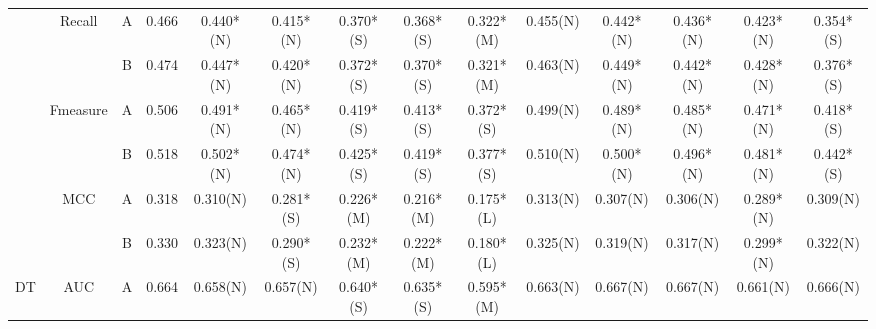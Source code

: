 \begin{table*}
{\begin{tabular}{|c|c|c|c|c|c|c|c|c|c|c|c|c|c|}
                      & \multirow{2}{*}{Recall}    & A                                                                             & 0.466         & 0.440*(N)             & 0.415*(N)        & 0.370*(S)        & 0.368*(S)       & 0.322*(M)         & 0.455(N)        & 0.442*(N)      & 0.436*(N)      & 0.423*(N)        & 0.354*(S)     \\ \cline{3-14} 
                      &                            & B                                                                             & 0.474         & 0.447*(N)            & 0.420*(N)         & 0.372*(S)       & 0.370*(S)        & 0.321*(M)         & 0.463(N)        & 0.449*(N)      & 0.442*(N)      & 0.428*(N)        & 0.376*(S)     \\ \cline{2-14} 
                      & \multirow{2}{*}{Fmeasure}  & A                                                                             & 0.506         & 0.491*(N)            & 0.465*(N)        & 0.419*(S)       & 0.413*(S)       & 0.372*(S)         & 0.499(N)        & 0.489*(N)      & 0.485*(N)      & 0.471*(N)        & 0.418*(S)     \\ \cline{3-14} 
                      &                            & B                                                                             & 0.518         & 0.502*(N)            & 0.474*(N)        & 0.425*(S)       & 0.419*(S)       & 0.377*(S)         & 0.510(N)         & 0.500*(N)        & 0.496*(N)      & 0.481*(N)        & 0.442*(S)     \\ \cline{2-14} 
                      & \multirow{2}{*}{MCC}       & A                                                                             & 0.318         & 0.310(N)              & 0.281*(S)        & 0.226*(M)       & 0.216*(M)       & 0.175*(L)         & 0.313(N)        & 0.307(N)       & 0.306(N)       & 0.289*(N)        & 0.309(N)      \\ \cline{3-14} 
                      &                            & B                                                                             & 0.330          & 0.323(N)             & 0.290*(S)         & 0.232*(M)       & 0.222*(M)       & 0.180*(L)          & 0.325(N)        & 0.319(N)       & 0.317(N)       & 0.299*(N)        & 0.322(N)      \\ \hline
\multirow{10}{*}{DT}  & \multirow{2}{*}{AUC}       & A                                                                             & 0.664         & 0.658(N)             & 0.657(N)         & 0.640*(S)        & 0.635*(S)       & 0.595*(M)         & 0.663(N)        & 0.667(N)       & 0.667(N)       & 0.661(N)         & 0.666(N)      \\ \cline{3-14} 

\end{tabular}}
\end{table*}

